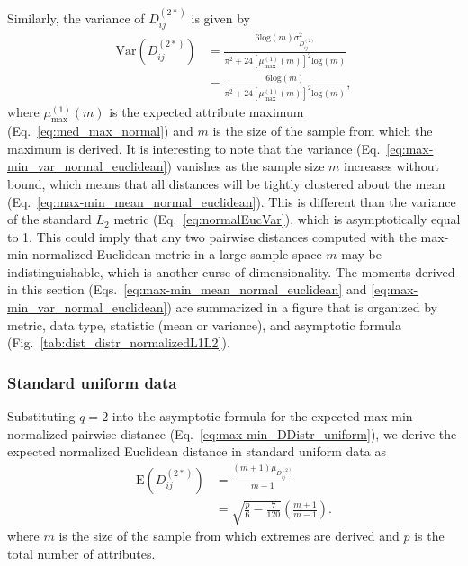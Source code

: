 \documentclass[10pt,letterpaper]{article}
\begin{document}
Similarly, the variance of $D^{(2*)}_{ij}$ is given by
%
\begin{equation}\label{eq:max-min_var_normal_euclidean}
\begin{aligned}
\text{Var}\left(D^{(2*)}_{ij}\right) &= \frac{6\text{log}(m)\sigma^2_{D^{(2)}_{ij}}}{\pi^2 + 24\left[\mu^{(1)}_\text{max}(m)\right]^2\text{log}(m)} \\
&= \frac{6\text{log}(m)}{\pi^2 + 24\left[\mu^{(1)}_\text{max}(m)\right]^2\text{log}(m)},
\end{aligned}
\end{equation}
%
where $\mu^{(1)}_\text{max}(m)$ is the expected attribute maximum (Eq.~\ref{eq:med_max_normal}) and $m$ is the size of the sample from which the maximum is derived. It is interesting to note that the variance (Eq.~\ref{eq:max-min_var_normal_euclidean}) vanishes as the sample size $m$ increases without bound, which means that all distances will be tightly clustered about the mean (Eq.~\ref{eq:max-min_mean_normal_euclidean}). This is different than the variance of the standard $L_2$ metric (Eq.~\ref{eq:normalEucVar}), which is asymptotically equal to 1. This could imply that any two pairwise distances computed with the max-min normalized Euclidean metric in a large sample space $m$ may be indistinguishable, which is another curse of dimensionality. The moments derived in this section (Eqs.~\ref{eq:max-min_mean_normal_euclidean} and \ref{eq:max-min_var_normal_euclidean}) are summarized in a figure that is organized by metric, data type, statistic (mean or variance), and asymptotic formula (Fig.~\ref{tab:dist_distr_normalizedL1L2}).

\subsubsection{Standard uniform data}

Substituting $q=2$ into the asymptotic formula for the expected max-min normalized pairwise distance (Eq.~\ref{eq:max-min_DDistr_uniform}), we derive the expected normalized Euclidean distance in standard uniform data as
%
\begin{equation}\label{eq:max-min_mean_uniform_euclidean}
\begin{aligned}
\text{E}\left(D^{(2*)}_{ij}\right) &= \frac{(m+1)\mu_{D^{(2)}_{ij}}}{m-1} \\
&= \sqrt{\frac{p}{6} - \frac{7}{120}}\left(\frac{m+1}{m-1}\right).
\end{aligned}
\end{equation}
%
where $m$ is the size of the sample from which extremes are derived and $p$ is the total number of attributes.
\end{document}
